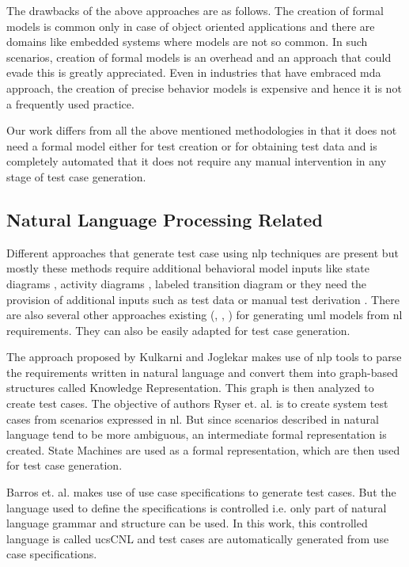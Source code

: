 The drawbacks of the above approaches are as follows. The creation of formal models is common only in case of object oriented applications and there are domains like embedded systems where models are not so common. In such scenarios, creation of formal models is an overhead and an approach that could evade this is greatly appreciated. Even in industries that have embraced \gls{mda} approach, the creation of precise behavior models is expensive and hence it is not a frequently used practice.

Our work differs from all the above mentioned methodologies in that it does not need a formal model either for test creation or for obtaining test data and is completely automated that it does not require any manual intervention in any stage of test case generation.

\subsection{Natural Language Processing Related}
Different approaches that generate test case using \gls{nlp} techniques are present but mostly these methods require additional behavioral model inputs like state diagrams \cite{ryser1999scenario}, activity diagrams \cite{hasling2008model}, labeled transition diagram \cite{katara2006making} or they need the provision of additional inputs such as test data or manual test derivation \cite{bertolino2003use}. There are also several other approaches existing (\cite{frohlich2000automated}, \cite{yue2010automated}, \cite{yue2013facilitating}) for generating \gls{uml} models from \gls{nl} requirements. They can also be easily adapted for test case generation.

The approach proposed by Kulkarni and Joglekar \cite{kulkarni2014generating} makes use of \gls{nlp} tools to parse the requirements written in natural language and convert them into graph-based structures called Knowledge Representation. This graph is then analyzed to create test cases. The objective of authors Ryser et. al. \cite{ryser1999practical} is to create system test cases from scenarios expressed in \gls{nl}. But since scenarios described in natural language tend to be more ambiguous, an intermediate formal representation is created. State Machines are used as a formal representation, which are then used for test case generation.

Barros et. al. \cite{barros2011ucscnl} makes use of use case specifications to generate test cases. But the language used to define the specifications is controlled i.e. only part of natural language grammar and structure can be used. In this work, this controlled language is called ucsCNL and test cases are automatically generated from use case specifications.

